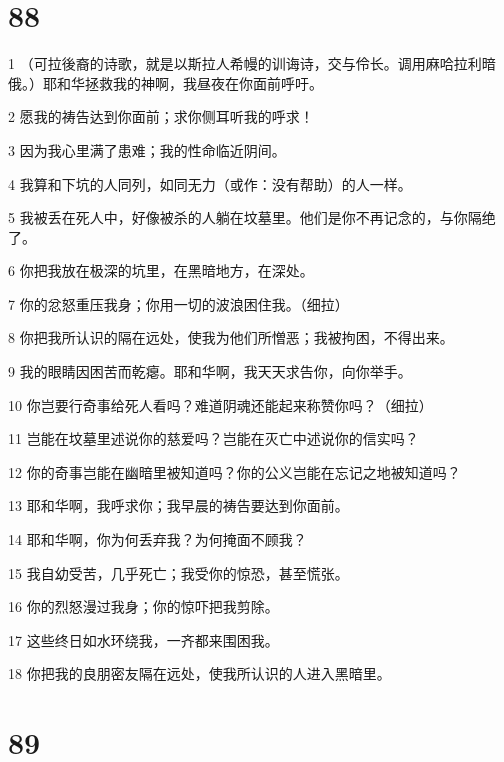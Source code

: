 \chapter{88}

\par 1 （可拉後裔的诗歌，就是以斯拉人希幔的训诲诗，交与伶长。调用麻哈拉利暗俄。）耶和华拯救我的神啊，我昼夜在你面前呼吁。
\par 2 愿我的祷告达到你面前；求你侧耳听我的呼求！
\par 3 因为我心里满了患难；我的性命临近阴间。
\par 4 我算和下坑的人同列，如同无力（或作：没有帮助）的人一样。
\par 5 我被丢在死人中，好像被杀的人躺在坟墓里。他们是你不再记念的，与你隔绝了。
\par 6 你把我放在极深的坑里，在黑暗地方，在深处。
\par 7 你的忿怒重压我身；你用一切的波浪困住我。（细拉）
\par 8 你把我所认识的隔在远处，使我为他们所憎恶；我被拘困，不得出来。
\par 9 我的眼睛因困苦而乾瘪。耶和华啊，我天天求告你，向你举手。
\par 10 你岂要行奇事给死人看吗？难道阴魂还能起来称赞你吗？（细拉）
\par 11 岂能在坟墓里述说你的慈爱吗？岂能在灭亡中述说你的信实吗？
\par 12 你的奇事岂能在幽暗里被知道吗？你的公义岂能在忘记之地被知道吗？
\par 13 耶和华啊，我呼求你；我早晨的祷告要达到你面前。
\par 14 耶和华啊，你为何丢弃我？为何掩面不顾我？
\par 15 我自幼受苦，几乎死亡；我受你的惊恐，甚至慌张。
\par 16 你的烈怒漫过我身；你的惊吓把我剪除。
\par 17 这些终日如水环绕我，一齐都来围困我。
\par 18 你把我的良朋密友隔在远处，使我所认识的人进入黑暗里。

\chapter{89}


